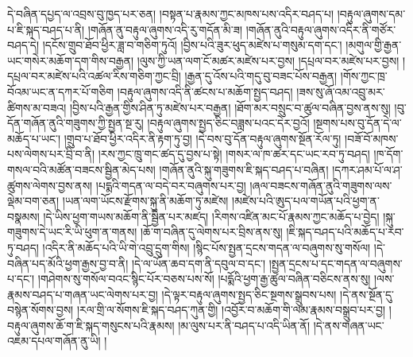 དེ་བཞིན་དཔྱད་ལ་འབྲས་བུ་ཁྱད་པར་ཅན། །བསྟན་པ་རྣམས་ཀྱང་མཁས་པས་འདིར་བཤད་པ། །བརྟུལ་ཞུགས་དམ་པ་ཇི་སྐད་བཤད་པ་ནི། །གཞོན་ནུ་བརྟུལ་ཞུགས་འདི་རུ་གདོན་མི་ཟ། །གཞོན་ནུའི་བརྟུལ་ཞུགས་འདིར་ནི་གཙོར་བཤད་དེ། །དངོས་གྲུབ་ཐོབ་ཕྱིར་ཟླ་བ་གཅིག་ཏུའོ། །བྱིས་པའི་ཟུར་ཕུད་མཛེས་པ་གསུམ་དག་དང་། །མགུལ་གྱི་རྒྱན་ཡང་གསེར་མཆོག་དག་གིས་བརྒྱན། །ལུས་ཀྱི་ཡན་ལག་ངོ་མཚར་མཛེས་པར་བྱས། །དཔྲལ་བར་མཛེས་པར་བྱས། །དཔྲལ་བར་མཛེས་པའི་འཚལ་རིས་གཅིག་ཀྱང་བྲི། །རྒྱན་དུ་འོས་པའི་གདུ་བུ་བཟང་པོས་བརྒྱན། །གོས་ཀྱང་ཁྲ་བོའམ་ཡང་ན་དཀར་པོ་གཅིག །བརྟུལ་ཞུགས་འདི་ནི་ཚངས་པ་མཆོག་སྤྱད་བཤད། །ཟས་སུ་ཞོ་འམ་འབྲུ་མར་ཚིགས་མ་བཟའ། །བྱིས་པའི་རྒྱན་གྱིས་ཤིན་ཏུ་མཛེས་པར་བརྒྱན། །ཐོག་མར་བསྲུང་བ་ཚུལ་བཞིན་བྱས་ནས་སུ། །བུ་དོན་གཞོན་ནུའི་གཟུགས་ཀྱི་སྤྱན་སྔ་རུ། །བརྟུལ་ཞུགས་སྤྱད་ཅིང་བཟླས་པའང་དེར་བྱའོ། །སྔགས་པས་བུ་དོན་དེ་ལ་མཆོད་པ་ཡང་། །གྲུབ་པ་ཐོབ་ཕྱིར་འདིར་ནི་རྟག་ཏུ་བྱ། །དེ་བས་བུ་དོན་བརྟུལ་ཞུགས་སྔོན་རོལ་ཏུ། །བཟོ་བོ་མཁས་པས་ལེགས་པར་བྲི་བ་ནི། །རས་ཀྱང་ཁྲུ་གང་ཚད་དུ་བྱས་པ་སྟེ། །གསར་ལ་ཁ་ཚར་དང་ཡང་རབ་ཏུ་བཤད། །ཁ་དོག་གསལ་བའི་མཚོན་བཟངས་སྦྱིན་མེད་པས། །གཞོན་ནུའི་སྐུ་གཟུགས་ཇི་སྐད་བཤད་པ་བཞིན། །དཀར་ཤམ་པོ་ལ་ཤ་ཚུགས་ལེགས་བྱས་ནས། །པདྨའི་གདན་ལ་བདེ་བར་བཞུགས་པར་བྱ། །ཞལ་བཟངས་གཞོན་ནུའི་གཟུགས་ལས་ལྡེམ་བག་ཅན། །ཡན་ལག་ཡོངས་རྫོགས་སྐུ་ནི་མཆོག་ཏུ་མཛེས། །མཛེས་པའི་ཨུད་པལ་གཡོན་པའི་ཕྱག་ན་བསྣམས། །དེ་ཡིས་ཕྱག་གཡས་མཆོག་ནི་སྦྱིན་པར་མཛད། །རིགས་འཛིན་མང་པོ་རྣམས་ཀྱང་མཆོད་པ་བྱེད། །སྐུ་གཟུགས་དེ་ཡང་རི་ཡི་ཕུག་ན་གནས། །ཆོ་ག་བཞིན་དུ་ལེགས་པར་བྲིས་ནས་སུ། །ཇི་སྐད་བཤད་པའི་མཆོད་པ་རབ་ཏུ་བཤད། །འདིར་ནི་མཆོད་པའི་ཡི་གེ་འབྲུ་དྲུག་གིས། །སྙིང་པོས་སྤྱན་དྲངས་གདན་ལ་བཞུགས་སུ་གསོལ། །དེ་བཞིན་པད་མོའི་ཕྱག་རྒྱས་བྱ་བ་ནི། །དེ་ལ་ཡོན་ཆབ་དག་ནི་དབུལ་བ་དང་། །སྤྱན་དྲངས་པ་དང་གདན་ལ་བཞུགས་པ་དང་། །གཤེགས་སུ་གསོལ་བའང་སྙིང་པོར་བཅས་པས་སོ། །པདྨོའི་ཕྱག་རྒྱ་ཚུལ་བཞིན་བཅིངས་ནས་སུ། །ལས་རྣམས་བཤད་པ་གཞན་ཡང་ལེགས་པར་བྱ། །དེ་ལྟར་བརྟུལ་ཞུགས་སྤྱད་ཅིང་སྔགས་སྒྲུབས་པས། །དེ་ནས་སྔོན་དུ་བསྙེན་སོགས་བྱས། །རལ་གྲི་ལ་སོགས་ཇི་སྐད་བཤད་ཀུན་གྱི། །འབྱོར་བ་མཆོག་གི་ལམ་རྣམས་བསྒྲུབ་པར་བྱ། །བརྟུལ་ཞུགས་ཆོ་ག་ཇི་སྐད་གསུངས་པའི་རྣམས། །མ་ལུས་པར་ནི་བཤད་པ་འདི་ཡིན་ནོ། །དེ་ནས་གཞན་ཡང་འཇམ་དཔལ་གཞོན་ནུ་ཡི། །
